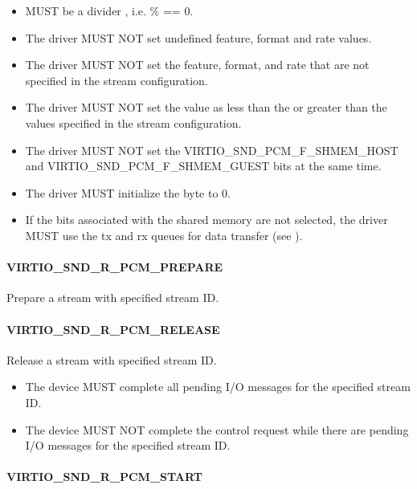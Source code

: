 \begin{itemize}
\item {} MUST be a divider , i.e.  \%  == 0.
\item The driver MUST NOT set undefined feature, format and rate values.
\item The driver MUST NOT set the feature, format, and rate that are not specified
in the stream configuration.
\item The driver MUST NOT set the  value as less than the 
or greater than the  values specified in the stream configuration.
\item The driver MUST NOT set the VIRTIO_SND_PCM_F_SHMEM_HOST and VIRTIO_SND_PCM_F_SHMEM_GUEST
bits at the same time.
\item The driver MUST initialize the  byte to 0.
\item If the bits associated with the shared memory are not selected, the driver
MUST use the tx and rx queues for data transfer
(see ).
\end{itemize}

\paragraph{VIRTIO_SND_R_PCM_PREPARE}

Prepare a stream with specified stream ID.

\paragraph{VIRTIO_SND_R_PCM_RELEASE}

Release a stream with specified stream ID.


\begin{itemize}
\item The device MUST complete all pending I/O messages for the specified
stream ID.
\item The device MUST NOT complete the control request while there are pending
I/O messages for the specified stream ID.
\end{itemize}

\paragraph{VIRTIO_SND_R_PCM_START}

